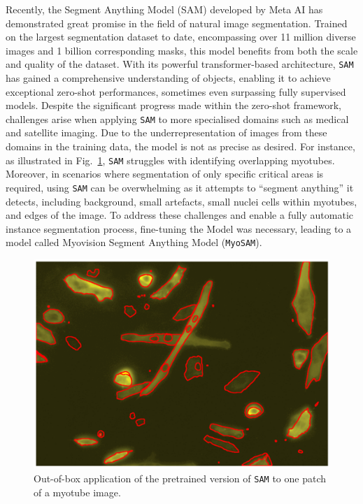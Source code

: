 Recently, the Segment Anything Model (SAM) \cite{kirillov2023segment} developed by Meta AI has demonstrated great promise in the field of natural image segmentation. Trained on the largest segmentation dataset to date, encompassing over 11 million diverse images and 1 billion corresponding masks, this model benefits from both the scale and quality of the dataset. With its powerful transformer-based architecture, \texttt{SAM} has gained a comprehensive understanding of objects, enabling it to achieve exceptional zero-shot performances, sometimes even surpassing fully supervised models.
Despite the significant progress made within the zero-shot framework, challenges arise when applying \texttt{SAM} to more specialised domains such as medical and satellite imaging. Due to the underrepresentation of images from these domains in the training data, the model is not as precise as desired. For instance, as illustrated in Fig.~\ref{figzeroshot}, \texttt{SAM} struggles with identifying overlapping myotubes. Moreover, in scenarios where segmentation of only specific critical areas is required, using \texttt{SAM} can be overwhelming as it attempts to “segment anything” it detects, including background, small artefacts, small nuclei cells within myotubes, and edges of the image. To address these challenges and enable a fully automatic instance segmentation process, fine-tuning the Model was necessary, leading to a model called Myovision Segment Anything Model (\texttt{MyoSAM}).

\begin{figure}
	\centering
	\includegraphics[width=\textwidth]{"images/sam_zeroshot.png"}
	\caption[\texttt{SAM} zeroshot]{Out-of-box application of the pretrained version of \texttt{SAM} to one patch of a myotube image.}
	\label{figzeroshot}
\end{figure}
